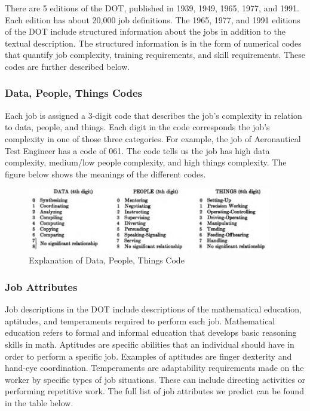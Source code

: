 \documentclass[12pt]{article}
\begin{document}
  There are 5 editions of the DOT, published in 1939, 1949, 1965, 1977, and 1991. Each edition has about 20,000 job definitions. The 1965, 1977, and 1991 editions of the DOT include structured information about the jobs in addition to the textual description. The structured information is in the form of numerical codes that quantify job complexity, training requirements, and skill requirements. These codes are further described below.

  \subsubsection*{Data, People, Things Codes}
  Each job is assigned a 3-digit code that describes the job's complexity in relation to data, people, and things. Each digit in the code corresponds the job's complexity in one of those three categories. For example, the job of Aeronautical Test Engineer has a code of 061. The code tells us the job has high data complexity, medium/low people complexity, and high things complexity. The figure below shows the meanings of the different codes.

      \begin{figure}[h]
        \centering
        \caption{Explanation of Data, People, Things Code}
        \includegraphics[width=0.95\textwidth, keepaspectratio=true]{images/DPT}
      \end{figure}

  \subsubsection*{Job Attributes}
  Job descriptions in the DOT include descriptions of the mathematical education, aptitudes, and temperaments required to perform each job. Mathematical education refers to formal and informal education that develops basic reasoning skills in math. Aptitudes are specific abilities that an individual should have in order to perform a specific job. Examples of aptitudes are finger dexterity and hand-eye coordination. Temperaments are adaptability requirements made on the worker by specific types of job situations. These can include directing activities or performing repetitive work. The full list of job attributes we predict can be found in the table below.
\end{document}
